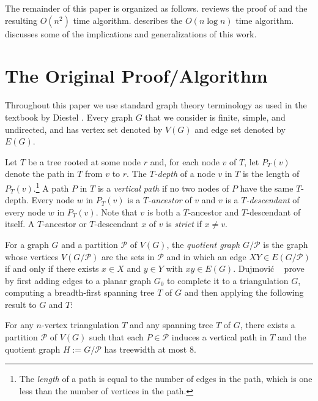 \documentclass[kpfonts]{patmorin}
\begin{document}
The remainder of this paper is organized as follows.  reviews the proof of  and the resulting $O(n^2)$ time algorithm.   describes the $O(n\log n)$ time algorithm.   discusses some of the implications and generalizations of this work.


\section{The Original Proof/Algorithm}

Throughout this paper we use standard graph theory terminology as used in the textbook by Diestel \cite{diestel:graph}.  Every graph $G$ that we consider is finite, simple, and undirected, and has vertex set denoted by $V(G)$ and edge set denoted by $E(G)$.

Let $T$ be a tree rooted at some node $r$ and, for each node $v$ of $T$, let $P_T(v)$ denote the path in $T$ from $v$ to $r$.  The \emph{$T$-depth} of a node $v$ in $T$ is the length of $P_T(v)$.\footnote{The \emph{length} of a path is equal to the number of edges in the path, which is one less than the number of vertices in the path.}  A path $P$ in $T$ is a \emph{vertical path} if no two nodes of $P$ have the same $T$-depth.  Every node $w$ in $P_T(v)$ is a \emph{$T$-ancestor} of $v$ and $v$ is a \emph{$T$-descendant} of every node $w$ in $P_T(v)$.  Note that $v$ is both a $T$-ancestor and $T$-descendant of itself.  A $T$-ancestor or $T$-descendant $x$ of $v$ is \emph{strict} if $x\neq v$.

For a graph $G$ and a partition $\mathcal{P}$ of $V(G)$, the \emph{quotient graph} $G/\mathcal{P}$ is the graph whose vertices $V(G/\mathcal{P})$ are the sets in $\mathcal{P}$ and in which an edge $XY\in E(G/\mathcal{P})$ if and only if there exists $x\in X$ and $y\in Y$ with $xy\in E(G)$.  Dujmović \etal\  \cite{dujmovic.joret.ea:planar} prove  by first adding edges to a planar graph $G_0$ to complete it to a triangulation $G$, computing a breadth-first spanning tree $T$ of $G$ and then applying the following result to $G$ and $T$:

\begin{thm}
  For any $n$-vertex triangulation $T$ and any spanning tree $T$ of $G$, there exists a partition $\mathcal{P}$ of $V(G)$ such that each $P\in\mathcal{P}$ induces a vertical path in $T$ and the quotient graph $H:=G/\mathcal{P}$ has treewidth at most $8$.
\end{thm}
\end{document}
